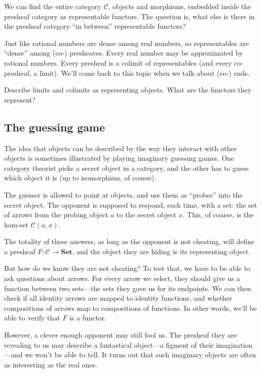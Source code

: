 \documentclass[DaoFP]{subfiles}
\begin{document}
We can find the entire category  $\mathcal{C}$, objects and morphisms, embedded inside the presheaf category as representable functors. The question is, what else is there in the presheaf category ``in between'' representable functors?

Just like rational numbers are dense among real numbers, so representables are ``dense'' among (co-) presheaves. Every real number may be approximated by rational numbers. Every presheaf is a colimit of representables (and every co-presheaf, a limit). We'll come back to this topic when we talk about (co-) ends.

\begin{exercise}
Describe limits and colimits as representing objects. What are the functors they represent?
\end{exercise}

\subsection{The guessing game}

The idea that objects can be described by the way they interact with other objects is sometimes illustrated by playing imaginary guessing games. One category theorist picks a secret object in a category, and the other has to guess which object it is (up to isomorphism, of course). 

The guesser is allowed to point at objects, and use them as ``probes'' into the secret object. The opponent is supposed to respond, each time, with a set: the set of arrows from the probing object $a$ to the secret object $x$. This, of course, is the hom-set $\mathcal{C}(a, x)$. 

The totality of these answers, as long as the opponent is not cheating, will define a presheaf $F \colon \mathcal{C} \to \mathbf{Set}$, and the object they are hiding is its representing object. 

But how do we know they are not cheating? To test that, we have to be able to ask questions about arrows. For every arrow we select, they should give us a function between two sets---the sets they gave us for its endpoints. We can then check if all identity arrows are mapped to identity functions, and whether compositions of arrows map to compositions of functions. In other words, we'll be able to verify that $F$ is a functor. 

However, a clever enough opponent may still fool us. The presheaf they are revealing to us may describe a fantastical object---a figment of their imagination---and we won't be able to tell. It turns out that such imaginary objects are often as interesting as the real ones. 
\end{document}
